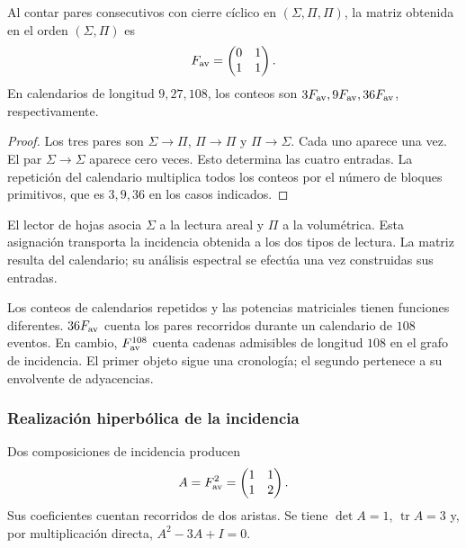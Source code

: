 \begin{teorema}
\label{eul:teo:fav}
Al contar pares consecutivos con cierre cíclico en
\((\Sigma,\Pi,\Pi)\), la matriz obtenida en el orden \((\Sigma,\Pi)\)
es
\[
 F_{\rm av}=\begin{pmatrix}0&1\\1&1\end{pmatrix}.
\]
En calendarios de longitud \(9,27,108\), los conteos son
\(3F_{\rm av},9F_{\rm av},36F_{\rm av}\), respectivamente.
\end{teorema}
\begin{proof}
Los tres pares son \(\Sigma\to\Pi\), \(\Pi\to\Pi\) y
\(\Pi\to\Sigma\). Cada uno aparece una vez. El par
\(\Sigma\to\Sigma\) aparece cero veces. Esto determina las cuatro
entradas. La repetición del calendario multiplica todos los conteos
por el número de bloques primitivos, que es \(3,9,36\) en los casos
indicados.
\end{proof}

El lector de hojas asocia \(\Sigma\) a la lectura areal y \(\Pi\) a
la volumétrica. Esta asignación transporta la incidencia obtenida a
los dos tipos de lectura. La matriz resulta del calendario; su análisis
espectral se efectúa una vez construidas sus entradas.

Los conteos de calendarios repetidos y las potencias matriciales tienen
funciones diferentes. \(36F_{\rm av}\) cuenta los pares recorridos
durante un calendario de \(108\) eventos. En cambio,
\(F_{\rm av}^{108}\) cuenta cadenas admisibles de longitud \(108\)
en el grafo de incidencia. El primer objeto sigue una cronología;
el segundo pertenece a su envolvente de adyacencias.

\subsubsection{Realización hiperbólica de la incidencia}

Dos composiciones de incidencia producen
\[
 A=F_{\rm av}^2=\begin{pmatrix}1&1\\1&2\end{pmatrix}.
\]
Sus coeficientes cuentan recorridos de dos aristas. Se tiene
\(\det A=1\), \(\operatorname{tr}A=3\) y, por multiplicación directa,
\(A^2-3A+I=0\).

